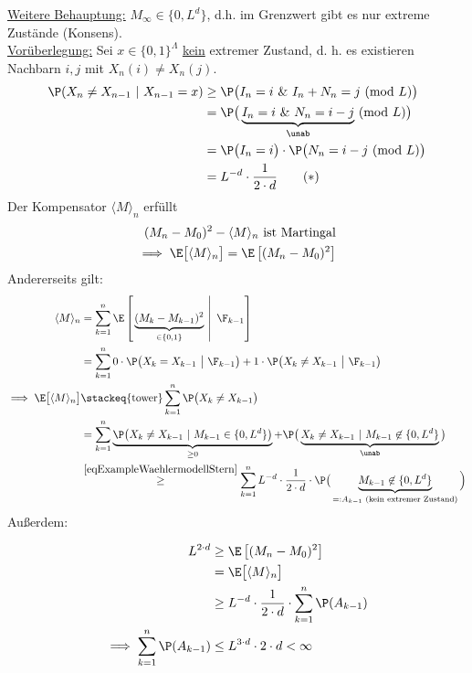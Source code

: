 \begin{beisp}[Wählermodell]
\ul{Weitere Behauptung:} $M_\infty\in\lbrace 0,L^d\rbrace$, d.h. im Grenzwert gibt es nur extreme Zustände (Konsens).\\

\ul{Vorüberlegung:} Sei $x\in\lbrace0,1\rbrace^{\Lambda}$ \ul{kein} extremer Zustand, d. h. es existieren Nachbarn $i,j$ mit $X_n(i)\neq X_n(j)$.
\begin{align}
\P(X_n\neq X_{n-1}~|~X_{n-1}=x)\nonumber
&\geq \P\big(I_n=i~\&~ I_n+N_n=j~(\text{mod } L)\big)\\
&=\P\big(\underbrace{I_n=i~\&~ N_n=i-j}_{\unab}~(\text{mod  }L)\big)\nonumber\\
&=\P\big(I_n=i\big)\cdot\P\big(N_n=i-j~(\text{mod  }L)\big)\nonumber\\
&=L^{-d}\cdot\frac{1}{2\cdot d}\label{eqExampleWaehlermodellStern}\tag{$\ast$}
\end{align}
Der Kompensator $\langle M\rangle_n$ erfüllt
\begin{align*}
(M_n-M_0)^2-\langle M\rangle_n\text{ ist Martingal}\\
\implies
\E\big[\langle M\rangle_n\big]=\E\left[(M_n-M_0)^2\right]
\end{align*}
Andererseits gilt:
\begin{align*}
\langle M\rangle_n 
&=\sum\limits_{k=1}^n\E\left[\left.\underbrace{(M_k-M_{k-1})^2}_{\in\lbrace0,1\rbrace}~\right|~\F_{k-1}\right]\\
&=\sum\limits_{k=1}^n0 \cdot \P\big(X_k= X_{k-1}~\big|~\F_{k-1}\big)+ 1 \cdot \P\big(X_k\neq X_{k-1}~\big|~\F_{k-1}\big)\\
\implies
\E\big[\langle M\rangle_n\big]
&\stackeq{\text{tower}}\sum\limits_{k=1}^n\P\big(X_k\neq X_{k-1}\big)\\
&=\sum\limits_{k=1}^n\underbrace{\P\big(X_k\neq X_{k-1}~|~ M_{k-1} \in \{0,L^d\}\big)}_{\geq 0} + \P\big(\underbrace{X_k\neq X_{k-1}~|~ M_{k-1} \not\in \{0,L^d\}}_{\unab}\big)\\
&\stackrel{\eqref{eqExampleWaehlermodellStern}}{\geq}
\sum\limits_{k=1}^n L^{-d}\cdot\frac{1}{2\cdot d}\cdot\P\big(\underbrace{M_{k-1}\not\in\lbrace0,L^d\rbrace}_{=:A_{k-1}\text{ (kein extremer Zustand)}}\Big)
\end{align*}
Außerdem:

\begin{align*}
L^{2\cdot d}
&\geq \E\left[(M_n-M_0)^2\right]\\
&=\E\big[\langle M\rangle_n\big]\\
&\geq L^{-d}\cdot\frac{1}{2\cdot d}\cdot\sum\limits_{k=1}^n\P(A_{k-1})\\
\implies
\sum\limits_{k=1}^n\P(A_{k-1})&\leq L^{3\cdot d}\cdot 2\cdot d<\infty
\end{align*}


\end{beisp}
